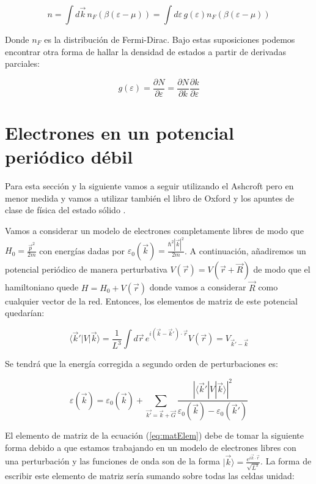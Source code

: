 \documentclass{article} %
\begin{document}
$$
n = \int d\vec{k} \, n_F(\beta(\varepsilon - \mu)) = \int d\varepsilon \, g(\varepsilon) n_F(\beta(\varepsilon - \mu))
$$

Donde $n_F$ es la distribución de Fermi-Dirac. Bajo estas suposiciones podemos encontrar otra forma de hallar la densidad de estados a partir de derivadas parciales:

\begin{equation}
g(\varepsilon) = \frac{\partial N}{\partial \varepsilon} = \frac{\partial N}{\partial k} \frac{\partial k}{\partial \varepsilon}
\end{equation}
\section{Electrones en un potencial periódico débil}

Para esta sección y la siguiente vamos a seguir utilizando el Ashcroft \cite{AshcroftSSP} pero en menor medida y vamos a utilizar también el libro de Oxford \cite{simon2013oxford} y los apuntes de clase de física del estado sólido \cite{apuntes}.

Vamos a considerar un modelo de electrones completamente libres de modo que $H_0 = \frac{\vec{p}^2}{2m}$ con energías dadas por $\varepsilon_0(\vec{k}) = \frac{\hbar^2 |\vec{k}|^2}{2m}$. A continuación, añadiremos un potencial periódico de manera perturbativa $V(\vec{r}) = V(\vec{r} + \vec{R})$ de modo que el hamiltoniano quede $H = H_0 + V(\vec{r})$ donde vamos a considerar $\vec{R}$ como cualquier vector de la red. Entonces, los elementos de matriz de este potencial quedarían:

\begin{equation}
\langle \vec{k}' | V | \vec{k} \rangle = \frac{1}{L^3} \int d\vec{r} \, e^{i(\vec{k}-\vec{k}')\cdot \vec{r}} V(\vec{r}) = V_{\vec{k}'-\vec{k}}
\label{eq:matElem}
\end{equation}

Se tendrá que la energía corregida a segundo orden de perturbaciones es:

\begin{equation}
\varepsilon(\vec{k}) = \varepsilon_0(\vec{k}) + \sum_{\vec{k'} = \vec{k} + \vec{G}} \frac{|\langle \vec{k}' | V | \vec{k} \rangle|^2}{\varepsilon_0(\vec{k}) - \varepsilon_0(\vec{k}')}
\label{eq:perturbedEnergy}
\end{equation}

El elemento de matriz de la ecuación (\ref{eq:matElem}) debe de tomar la siguiente forma debido a que estamos trabajando en un modelo de electrones libres con una perturbación y las funciones de onda son de la forma $|\vec{k}\rangle = \frac{e^{i \vec{k} \cdot \vec{r}}}{\sqrt{L^3}}$. La forma de escribir este elemento de matriz sería sumando sobre todas las celdas unidad:
\end{document}
